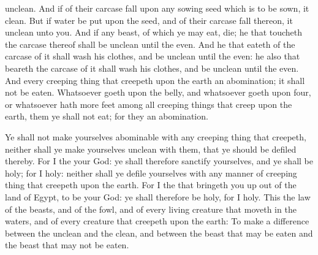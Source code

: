 {unclean.
And if
{} of their
carcase
fall upon any
sowing
seed which is to be
sown, it
{}
clean.
But if
{}
water be
put upon the
seed, and
{} of their
carcase
fall thereon, it
{}
unclean unto you.
And if any
beast, of which ye may
eat,
die; he that
toucheth the
carcase thereof shall be
unclean until the
even.
And he that
eateth of the
carcase of it shall
wash his
clothes, and be
unclean until the
even: he also that
beareth the
carcase of it shall
wash his
clothes, and be
unclean until the
even.
And every creeping
thing that
creepeth upon the
earth
{} an
abomination; it shall not be
eaten.
Whatsoever
goeth upon the
belly, and whatsoever
goeth upon
{}
four, or whatsoever hath
more
feet among all creeping
things that
creep upon the
earth, them ye shall not
eat; for they
{} an
abomination.
\par }{\PP {}Ye shall not
make
yourselves
abominable with any creeping
thing that
creepeth, neither shall ye make yourselves
unclean with them, that ye should be
defiled thereby.
For I
{} the
{} your
God: ye shall therefore sanctify
yourselves, and ye shall be
holy; for I
{}
holy: neither shall ye
defile
yourselves with any manner of creeping
thing that
creepeth upon the
earth.
For I
{} the
{} that
bringeth you up out of the
land of
Egypt, to be your
God: ye shall therefore be
holy, for I
{}
holy.
This
{} the
law of the
beasts, and of the
fowl, and of every
living
creature that
moveth in the
waters, and of every
creature that
creepeth upon the
earth:
To make a
difference between the
unclean and the
clean, and between the
beast that may be
eaten and the
beast that may not be
eaten.

}
